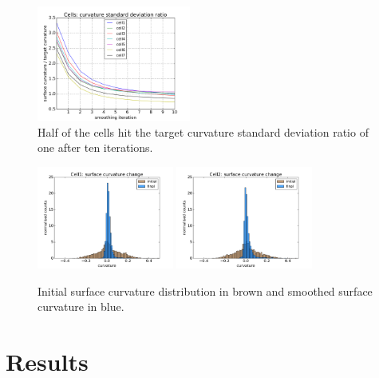 \documentclass[a4paper,10pt]{article}
\begin{document}
\begin{figure}[H]
\begin{center}
\includegraphics[width=0.45\textwidth]{images/cell_curv_std.pdf}
\end{center}
\caption{Half of the cells hit the target curvature standard deviation ratio of one after ten iterations.}
\label{fig:curv_std}
\end{figure}

\begin{figure}[H]
\begin{center}
\includegraphics[width=0.4\textwidth]{images/cell1_curv_morph.pdf}
\includegraphics[width=0.4\textwidth]{images/cell2_curv_morph.pdf}
\end{center}
\caption{Initial surface curvature distribution in brown and smoothed surface curvature in blue.}
\label{fig:morph_histogram}
\end{figure}

\section{Results}
\end{document}
